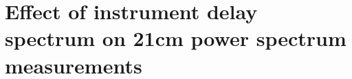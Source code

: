 \documentclass[twocolumn]{emulateapj}
\begin{document}
%
%

\section{\textbf{Effect of instrument delay spectrum on 21cm power spectrum measurements}}
\end{document}
